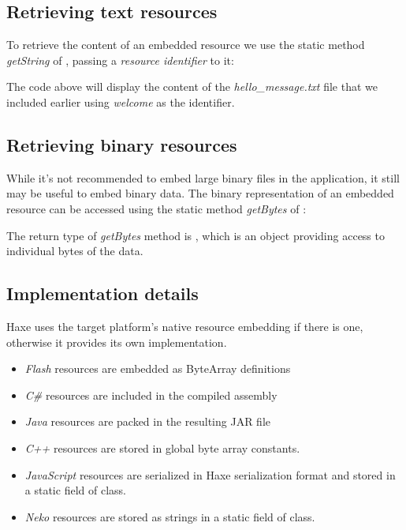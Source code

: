 \subsection{Retrieving text resources}
\label{cr-resources-getString}

To retrieve the content of an embedded resource we use the static method \emph{getString} of , passing a \emph{resource identifier} to it:


The code above will display the content of the \emph{hello_message.txt} file that we included earlier using \emph{welcome} as the identifier.

\subsection{Retrieving binary resources}
\label{cr-resources-getBytes}

While it's not recommended to embed large binary files in the application, it still may be useful to embed binary data. The binary representation of an embedded resource can be accessed using the static method \emph{getBytes} of :


The return type of \emph{getBytes} method is , which is an object providing access to individual bytes of the data.

\subsection{Implementation details}
\label{cr-resources-impl}

Haxe uses the target platform's native resource embedding if there is one, otherwise it provides its own implementation.

\begin{itemize}
\item \emph{Flash} resources are embedded as ByteArray definitions
\item \emph{C\#} resources are included in the compiled assembly
\item \emph{Java} resources are packed in the resulting JAR file
\item \emph{C++} resources are stored in global byte array constants.
\item \emph{JavaScript} resources are serialized in Haxe serialization format and stored in a static field of  class.
\item \emph{Neko} resources are stored as strings in a static field of  class.
\end{itemize}



